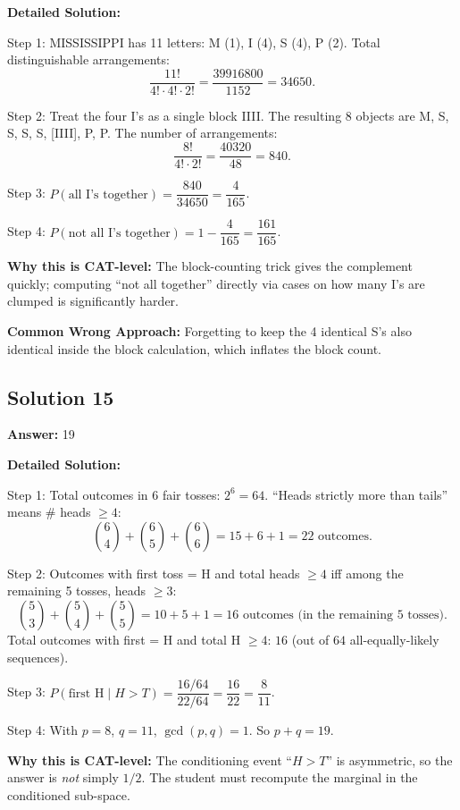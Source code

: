 \documentclass[11pt,a4paper]{article}
\begin{document}
\textbf{Detailed Solution:}

Step 1: MISSISSIPPI has 11 letters: M (1), I (4), S (4), P (2). Total distinguishable arrangements:
\[
\frac{11!}{4! \cdot 4! \cdot 2!} = \frac{39916800}{1152} = 34650.
\]

Step 2: Treat the four I's as a single block IIII. The resulting 8 objects are M, S, S, S, S, [IIII], P, P. The number of arrangements:
\[
\frac{8!}{4! \cdot 2!} = \frac{40320}{48} = 840.
\]

Step 3: \(P(\text{all I's together}) = \dfrac{840}{34650} = \dfrac{4}{165}\).

Step 4: \(P(\text{not all I's together}) = 1 - \dfrac{4}{165} = \dfrac{161}{165}\).

\textbf{Why this is CAT-level:} The block-counting trick gives the complement quickly; computing ``not all together'' directly via cases on how many I's are clumped is significantly harder.

\textbf{Common Wrong Approach:} Forgetting to keep the 4 identical S's also identical inside the block calculation, which inflates the block count.

\subsection*{Solution 15}
\textbf{Answer:} 19

\textbf{Detailed Solution:}

Step 1: Total outcomes in 6 fair tosses: \(2^6 = 64\). ``Heads strictly more than tails'' means \# heads \(\geq 4\):
\[
\binom{6}{4} + \binom{6}{5} + \binom{6}{6} = 15 + 6 + 1 = 22 \text{ outcomes}.
\]

Step 2: Outcomes with first toss = H and total heads \(\geq 4\) iff among the remaining 5 tosses, heads \(\geq 3\):
\[
\binom{5}{3} + \binom{5}{4} + \binom{5}{5} = 10 + 5 + 1 = 16 \text{ outcomes (in the remaining 5 tosses)}.
\]
Total outcomes with first = H and total H \(\geq 4\): \(16\) (out of \(64\) all-equally-likely sequences).

Step 3: \(P(\text{first H} \mid H > T) = \dfrac{16/64}{22/64} = \dfrac{16}{22} = \dfrac{8}{11}\).

Step 4: With \(p = 8\), \(q = 11\), \(\gcd(p, q) = 1\). So \(p + q = 19\).

\textbf{Why this is CAT-level:} The conditioning event ``\(H > T\)'' is asymmetric, so the answer is \emph{not} simply \(1/2\). The student must recompute the marginal in the conditioned sub-space.
\end{document}

